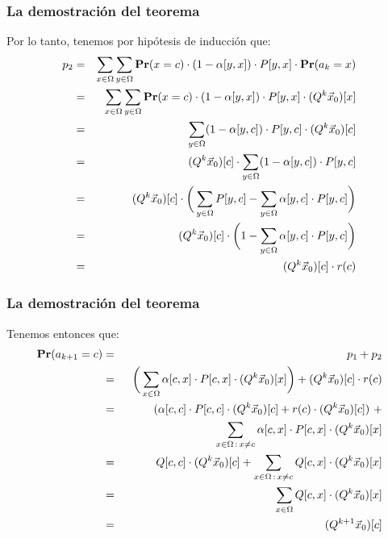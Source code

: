 \documentclass{beamer}
\newcommand{\pr}{{\rm {\bf Pr}}}
\begin{document}
	
	
	
	
	\begin{frame}
		\frametitle{La demostración del teorema}
		
		{\footnotesize
			
			Por lo tanto, tenemos por hipótesis de inducción que:
			\begin{eqnarray*}
				p_2
				&=& \sum_{x\in\Omega}\sum_{y\in\Omega} \pr(x=c) \cdot 
				(1-\alpha[y,x]) \cdot P[y,x] \cdot \pr(a_k=x) \\
				&=& \sum_{x\in\Omega}\sum_{y\in\Omega} \pr(x=c) \cdot
				(1-\alpha[y,x]) \cdot P[y,x] \cdot (Q^k \vec x_0)[x] \\
				&=& \sum_{y\in\Omega} 
				(1-\alpha[y,c])\cdot  P[y,c] \cdot (Q^k \vec x_0)[c] \\
				&=& (Q^k \vec x_0)[c] \cdot \sum_{y\in\Omega} 
				(1-\alpha[y,c]) \cdot P[y,c] \\
				&=& (Q^k \vec x_0)[c] \cdot \bigg(\sum_{y\in\Omega} P[y,c] - 
				\sum_{y\in\Omega}\alpha[y,c] \cdot P[y,c] \bigg) \\
				&=& (Q^k \vec x_0)[c] \cdot \bigg(1 - 
				\sum_{y\in\Omega}\alpha[y,c] \cdot P[y,c] \bigg) \\
				&=& (Q^k \vec x_0)[c] \cdot r(c)
			\end{eqnarray*}
			
		}
		
	\end{frame}
	
	
	
	
	
	\begin{frame}
		\frametitle{La demostración del teorema}
		
		{\footnotesize
			
			Tenemos entonces que:
			\begin{eqnarray*}
				\pr(a_{k+1}=c)
				& = & p_1 + p_2 \\
				& = & \bigg(\sum_{x\in\Omega} \alpha[c,x] \cdot P[c,x] \cdot (Q^k \vec x_0)[x]\bigg) + (Q^k \vec x_0)[c] \cdot r(c) \\
				& = & (\alpha[c,c] \cdot P[c,c] \cdot (Q^k \vec x_0)[c] + r(c) \cdot (Q^k \vec x_0)[c]) \ + \\
				&&\hspace{80pt} \sum_{x\in\Omega \,:\, x \neq c} \alpha[c,x] \cdot P[c,x] \cdot (Q^k \vec x_0)[x] \\
				& = & Q[c,c] \cdot (Q^k \vec x_0)[c] + 
				\sum_{x\in\Omega \,:\, x \neq c} Q[c,x] \cdot (Q^k \vec x_0)[x] \\
				&= &\sum_{x\in\Omega} Q[c,x] \cdot (Q^k \vec x_0)[x] \\
				&= & (Q^{k+1} \vec x_0)[c]
			\end{eqnarray*}
			
		}
		
	\end{frame}
	
\end{document}
